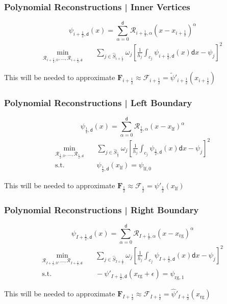 \documentclass[10pt,fleqn]{beamer}
\begin{document}
\begin{frame}
\frametitle{Polynomial Reconstructions | Inner Vertices}

\[
\psi_{i+\frac{1}{2},\mathsf{d}}(x)=\sum_{\alpha=0}^\mathsf{d} \mathcal R_{i+\frac{1}{2},\alpha}(x-x_{i+\frac{1}{2}})^\alpha
\]
\begin{align*}
\min_{\mathcal R_{i+\frac{1}{2},0},\ldots,\mathcal R_{i+\frac{1}{2},\mathsf d}} & \quad
\sum_{j\in\widehat S_{i+\frac{1}{2}}} \omega_j\left [\frac{1}{h_j} \int_{c_j} \psi_{i+\frac{1}{2},\mathsf{d}}(x)\mathsf dx -\psi_j \right]^2
\end{align*}

This will be needed to approximate $\mathbf{F}_{i+\frac{1}{2}}\approx\mathcal{F}_{i+\frac{1}{2}}= \widetilde \psi'_{i+\frac{1}{2}}(x_{i+\frac{1}{2}})$

\end{frame}

\begin{frame}
\frametitle{Polynomial Reconstructions | Left Boundary}

\[
\psi_{\frac{1}{2},\mathsf{d}}(x)=\sum_{\alpha=0}^\mathsf{d} \mathcal R_{\frac{1}{2},\alpha}(x-x_{\text{lf}})^\alpha
\]
\begin{align*}
\min_{\mathcal R_{\frac{1}{2},0},\ldots,\mathcal R_{\frac{1}{2},\mathsf d}} & \quad
\sum_{j\in\widehat S_\frac{1}{2}} \omega_j\left [\frac{1}{h_j} \int_{c_j} \psi_{\frac{1}{2},\mathsf{d}}(x)\mathsf dx -\psi_j \right]^2\\
\text{s.t.} & \quad \psi_{\frac{1}{2},\mathsf{d}}(x_{\text{lf}})=\psi_{\text{lf},0}
\end{align*}

This will be needed to approximate $\mathbf{F}_{\frac{1}{2}}\approx\mathcal{F}_{\frac{1}{2}} = \psi'_{\frac{1}{2}}(x_{\text{lf}})$
\end{frame}

\begin{frame}
\frametitle{Polynomial Reconstructions | Right Boundary}

\[
\psi_{I+\frac{1}{2},\mathsf{d}}(x)=\sum_{\alpha=0}^\mathsf{d} \mathcal R_{I+\frac{1}{2},\alpha}(x-x_{\text{rg}})^\alpha
\]
\begin{align*}
\min_{\mathcal R_{I+\frac{1}{2},0},\ldots,\mathcal R_{I+\frac{1}{2},\mathsf d}} & \quad
\sum_{j\in\widehat S_{I+\frac{1}{2}}} \omega_j\left [\frac{1}{h_j} \int_{c_j} \psi_{I+\frac{1}{2},\mathsf{d}}(x)\mathsf dx -\psi_j \right]^2\\
\text{s.t.} & \quad -\psi'_{I+\frac{1}{2},\mathsf{d}}(x_{\text{rg}}+\epsilon)=\psi_{\text{rg},1}
\end{align*}

This will be needed to approximate $\mathbf{F}_{I+\frac{1}{2}}\approx\mathcal{F}_{I+\frac{1}{2}}=\widehat \psi'_{I+\frac{1}{2}}(x_{\text{rg}})$
\end{frame}
\end{document}
